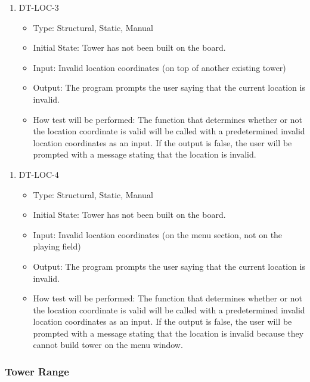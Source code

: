 \documentclass[12,english]{article}
\begin{document}
\begin{enumerate}
    \item DT-LOC-3
    \begin{itemize}
        \item Type: Structural, Static, Manual
        \item Initial State: Tower has not been built on the board.
        \item Input: Invalid location coordinates (on top of another existing tower)
        \item Output: The program prompts the user saying that the current location is invalid.
        \item How test will be performed: The function that determines whether or not the location coordinate is valid will be called with a predetermined invalid location coordinates as an input. If the output is false, the user will be prompted with a message stating that the location is invalid.
    \end{itemize}
\end{enumerate}

\begin{enumerate}
    \item DT-LOC-4
    \begin{itemize}
        \item Type: Structural, Static, Manual
        \item Initial State: Tower has not been built on the board.
        \item Input: Invalid location coordinates (on the menu section, not on the playing field)
        \item Output: The program prompts the user saying that the current location is invalid.
        \item How test will be performed: The function that determines whether or not the location coordinate is valid will be called with a predetermined invalid location coordinates as an input. If the output is false, the user will be prompted with a message stating that the location is invalid because they cannot build tower on the menu window.
    \end{itemize}
\end{enumerate}

\subsubsection{Tower Range}
\end{document}
